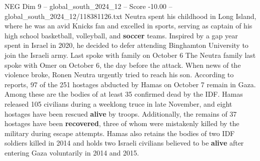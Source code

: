 \begin{textsample}{NEG Dim 9 – global\_south\_2024\_12 – Score -10.00 – global\_south\_2024\_12/118381126.txt}
Neutra spent his childhood in Long Island, where he was an avid Knicks fan and excelled in sports, serving as captain of his high school basketball, volleyball, and \textbf{soccer} teams.
Inspired by a gap year spent in Israel in 2020, he decided to defer attending Binghamton University to join the Israeli army.
Last spoke with family on October 6 The Neutra family last spoke with Omer on October 6, the day before the attack.
When news of the violence broke, Ronen Neutra urgently tried to reach his son.
According to reports, 97 of the 251 hostages abducted by Hamas on October 7 remain in Gaza.
Among these are the bodies of at least 35 confirmed dead by the IDF.
Hamas released 105 civilians during a weeklong truce in late November, and eight hostages have been rescued \textbf{alive} by troops.
Additionally, the remains of 37 hostages have been \textbf{recovered}, three of whom were mistakenly killed by the military during escape attempts.
Hamas also retains the bodies of two IDF soldiers killed in 2014 and holds two Israeli civilians believed to be \textbf{alive} after entering Gaza voluntarily in 2014 and 2015.

\end{textsample}
